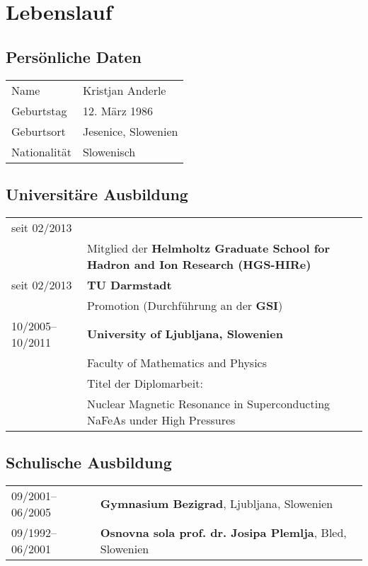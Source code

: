 
\chapter*{Lebenslauf}

\section*{Pers\"onliche Daten}
\begin{tabular}{p{}p{}}
  \hfill Name & Kristjan Anderle\\
  \hfill Geburtstag & 12. M\"{a}rz 1986\\
  \hfill Geburtsort & Jesenice, Slowenien\\
  \hfill Nationalit\"at & Slowenisch\\
\end{tabular}

\section*{Universit\"are Ausbildung}
\begin{tabular}{p{}p{}}
  \hfill seit 02/2013 \\
  & Mitglied der \textbf{Helmholtz Graduate School for Hadron and Ion Research (HGS-HIRe)} \\
  \hfill seit 02/2013 & \textbf{TU Darmstadt} \\
  & Promotion (Durchf\"uhrung an der \textbf{GSI})\\
  \hfill 10/2005--10/2011 & \textbf{University of Ljubljana, Slowenien}\\
  & Faculty of Mathematics and Physics\\
  & Titel der Diplomarbeit: \\
  & Nuclear Magnetic Resonance in Superconducting NaFeAs under High Pressures \\
\end{tabular}

\section*{Schulische Ausbildung}
\begin{tabular}{p{}p{}}
  \hfill 09/2001--06/2005 & \textbf{Gymnasium Bezigrad}, Ljubljana, Slowenien\\
  \hfill 09/1992--06/2001 & \textbf{Osnovna sola prof. dr. Josipa Plemlja}, Bled, Slowenien\\
\end{tabular}
